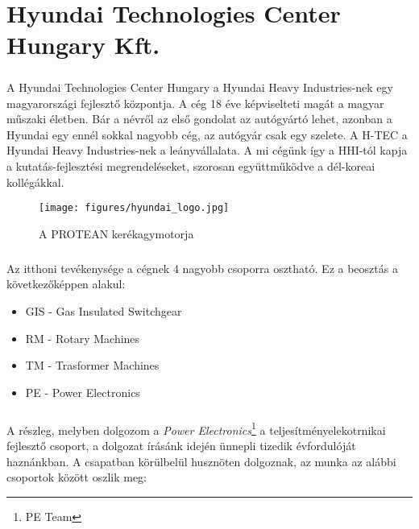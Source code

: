 \chapter*{Hyundai Technologies Center Hungary Kft.}

\paragraph{}
A Hyundai Technologies Center Hungary a Hyundai Heavy Industries-nek egy magyarországi fejlesztő központja. A cég 18 éve képviselteti magát a magyar műszaki életben. Bár a névről az első gondolat az autógyártó lehet, azonban a Hyundai egy ennél sokkal nagyobb cég, az autógyár csak egy szelete. A H-TEC a Hyundai Heavy Industries-nek a leányvállalata. A mi cégünk így a HHI-tól kapja a kutatás-fejlesztési megrendeléseket, szorosan együttműködve a dél-koreai kollégákkal.

\begin{figure}[H]
	\centering
	\texttt{[image: figures/hyundai\_logo.jpg]}
	\caption{A PROTEAN kerékagymotorja} 
	\label{fig:protean}
\end{figure}

\paragraph{}
Az itthoni tevékenysége a cégnek 4 nagyobb csoporra osztható. Ez a beosztás a következőképpen alakul:


\begin{itemize}
	\item{GIS - Gas Insulated Switchgear}
	\item{RM - Rotary Machines}
	\item{TM - Trasformer Machines}
	\item{PE - Power Electronics}
\end{itemize}


\paragraph{}
A részleg, melyben dolgozom a \emph{Power Electronics}\footnote{PE Team} a teljesítményelekotrnikai fejlesztő csoport, a dolgozat írásánk idején ünnepli tizedik évfordulóját haznánkban. A csapatban körülbelül husznöten dolgoznak, az munka az alábbi csoportok között oszlik meg:

